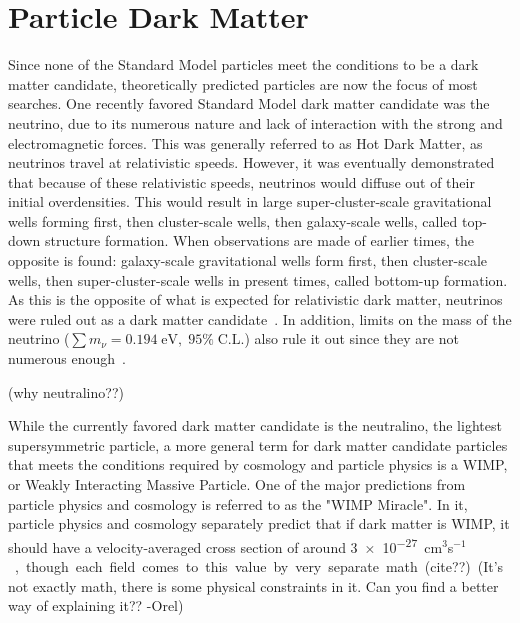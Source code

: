 \section{Particle Dark Matter}\label{sec_particledm}

  Since none of the Standard Model particles meet the conditions to be a dark matter candidate, theoretically predicted particles are now the focus of most searches.
  One recently favored Standard Model dark matter candidate was the neutrino, due to its numerous nature and lack of interaction with the strong and electromagnetic forces.
  This was generally referred to as Hot Dark Matter, as neutrinos travel at relativistic speeds.
  However, it was eventually demonstrated that because of these relativistic speeds, neutrinos would diffuse out of their initial overdensities.
  This would result in large super-cluster-scale gravitational wells forming first, then cluster-scale wells, then galaxy-scale wells, called top-down structure formation.
  When observations are made of earlier times, the opposite is found: galaxy-scale gravitational wells form first, then cluster-scale wells, then super-cluster-scale wells in present times, called bottom-up formation.
  As this is the opposite of what is expected for relativistic dark matter, neutrinos were ruled out as a dark matter candidate~\cite{neutrinoHeirarchical}.
  In addition, limits on the mass of the neutrino ($\sum{}m_{\nu} = 0.194 \; \textrm{eV}, \; 95\% \; \textrm{C.L.}$) also rule it out since they are not numerous enough~\cite{planck2015}.
  
  {\color{red}(why neutralino??)}
  
  While the currently favored dark matter candidate is the neutralino, the lightest supersymmetric particle, a more general term for dark matter candidate particles that meets the conditions required by cosmology and particle physics is a WIMP, or Weakly Interacting Massive Particle.
  One of the major predictions from particle physics and cosmology is referred to as the "WIMP Miracle".
  In it, particle physics and cosmology separately predict that if dark matter is WIMP, it should have a velocity-averaged cross section of around \SI{3e-27}{cm$^3$s$^{-1}$}, though each field comes to this value by very separate math. {\color{red}(cite??)}
  {\color{red}(It's not exactly math, there is some physical constraints in it. Can you find a better way of explaining it?? -Orel)}

